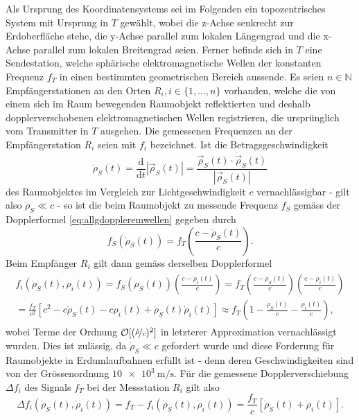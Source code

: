 \documentclass[a4paper,12pt]{article}
\numberwithin{equation}{section}
\begin{document}
Als Ursprung des Koordinatensystems sei im Folgenden ein topozentrisches System mit Ursprung in $T$ gewählt, wobei die z-Achse senkrecht zur Erdoberfläche stehe, die y-Achse parallel zum lokalen Längengrad und die x-Achse parallel zum lokalen Breitengrad seien. Ferner befinde sich in $T$ eine Sendestation, welche sphärische elektromagnetische Wellen der konstanten Frequenz $f_T$ in einen bestimmten geometrischen Bereich aussende. Es seien $n \in \mathbb{N}$ Empfängerstationen an den Orten $R_i, i \in \{1,\dots,n\}$ vorhanden, welche die von einem sich im Raum bewegenden Raumobjekt reflektierten und deshalb dopplerverschobenen elektromagnetischen Wellen registrieren, die ursprünglich vom Transmitter in $T$ ausgehen. Die gemessenen Frequenzen an der Empfängerstation $R_i$ seien mit $f_i$ bezeichnet. Ist die Betragsgeschwindigkeit \begin{equation}\label{eq:betrgeschwrhos}\dot{\rho}_S(t) = \frac{\mathrm{d}}{\mathrm{d}t}|\vec{\rho}_S(t)| = \frac{\vec{\rho}_S(t)\cdot \dot{\vec{\rho}}_S(t)}{|\vec{\rho}_S(t)|}\end{equation} des Raumobjektes im Vergleich zur Lichtgeschwindigkeit $c$ vernachlässigbar - gilt also $\dot{\rho}_S \ll c$ - so ist die beim Raumobjekt zu messende Frequenz $f_S$ gemäss der Dopplerformel \eqref{eq:allgdoppleremwellen} gegeben durch \begin{equation}
f_S(\dot{\rho}_S(t)) = f_T\left(\frac{c-\dot{\rho}_S(t)}{c}\right).
\end{equation} Beim Empfänger $R_i$ gilt dann gemäss derselben Dopplerformel \begin{gather}\begin{gathered}
f_i(\dot{\rho}_S(t),\dot{\rho}_i(t)) = f_S(\dot{\rho}_S(t))\left(\frac{c-\dot{\rho}_i(t)}{c}\right) = f_T\left(\frac{c-\dot{\rho}_S(t)}{c}\right)\left(\frac{c-\dot{\rho}_i(t)}{c}\right) \\ = \frac{f_T}{c^2}[c^2-c\dot{\rho}_S(t)-c\dot{\rho}_i(t)+\dot{\rho}_S(t)\dot{\rho}_i(t)] \approx f_T\left(1-\frac{\dot{\rho}_S(t)}{c}-\frac{\dot{\rho}_i(t)}{c}\right),
\end{gathered}\end{gather} wobei Terme der Ordnung $\mathcal{O}[(\nicefrac{\dot{\rho}}{c})^2]$ in letzterer Approximation vernachlässigt wurden. Dies ist zulässig, da $\dot{\rho}_S \ll c$ gefordert wurde und diese Forderung für Raumobjekte in Erdumlaufbahnen erfüllt ist - denn deren Geschwindigkeiten sind von der Grössenordnung $\SI{10e3}{\meter\per\second}$. Für die gemessene Dopplerverschiebung $\Delta f_i$ des Signals $f_T$ bei der Messstation $R_i$ gilt also \begin{equation}\label{eq:exaktdopplergrund}
\Delta f_i(\dot{\rho}_S(t),\dot{\rho}_i(t)) = f_T-f_i(\dot{\rho}_S(t),\dot{\rho}_i(t)) = \frac{f_T}{c}[\dot{\rho}_S(t)+\dot{\rho}_i(t)].
\end{equation} 
\end{document}
